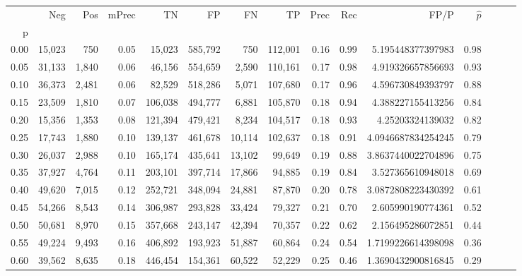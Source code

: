 \begin{tabular}{rrrrrrrrrrrrrrr}
\toprule
{} &     Neg &     Pos & mPrec &       TN &       FP &       FN &       TP &  Prec &   Rec &                 FP/P & $\hat{p}$ \\
p    &         &         &       &          &          &          &          &       &       &                      &           \\
\midrule
0.00 &  15,023 &     750 &  0.05 &   15,023 &  585,792 &      750 &  112,001 &  0.16 &  0.99 &    5.195448377397983 &      0.98 \\
0.05 &  31,133 &   1,840 &  0.06 &   46,156 &  554,659 &    2,590 &  110,161 &  0.17 &  0.98 &    4.919326657856693 &      0.93 \\
0.10 &  36,373 &   2,481 &  0.06 &   82,529 &  518,286 &    5,071 &  107,680 &  0.17 &  0.96 &    4.596730849393797 &      0.88 \\
0.15 &  23,509 &   1,810 &  0.07 &  106,038 &  494,777 &    6,881 &  105,870 &  0.18 &  0.94 &    4.388227155413256 &      0.84 \\
0.20 &  15,356 &   1,353 &  0.08 &  121,394 &  479,421 &    8,234 &  104,517 &  0.18 &  0.93 &     4.25203324139032 &      0.82 \\
0.25 &  17,743 &   1,880 &  0.10 &  139,137 &  461,678 &   10,114 &  102,637 &  0.18 &  0.91 &   4.0946687834254245 &      0.79 \\
0.30 &  26,037 &   2,988 &  0.10 &  165,174 &  435,641 &   13,102 &   99,649 &  0.19 &  0.88 &   3.8637440022704896 &      0.75 \\
0.35 &  37,927 &   4,764 &  0.11 &  203,101 &  397,714 &   17,866 &   94,885 &  0.19 &  0.84 &    3.527365610948018 &      0.69 \\
0.40 &  49,620 &   7,015 &  0.12 &  252,721 &  348,094 &   24,881 &   87,870 &  0.20 &  0.78 &   3.0872808223430392 &      0.61 \\
0.45 &  54,266 &   8,543 &  0.14 &  306,987 &  293,828 &   33,424 &   79,327 &  0.21 &  0.70 &    2.605990190774361 &      0.52 \\
0.50 &  50,681 &   8,970 &  0.15 &  357,668 &  243,147 &   42,394 &   70,357 &  0.22 &  0.62 &    2.156495286072851 &      0.44 \\
0.55 &  49,224 &   9,493 &  0.16 &  406,892 &  193,923 &   51,887 &   60,864 &  0.24 &  0.54 &   1.7199226614398098 &      0.36 \\
0.60 &  39,562 &   8,635 &  0.18 &  446,454 &  154,361 &   60,522 &   52,229 &  0.25 &  0.46 &   1.3690432900816845 &      0.29 \\

\end{tabular}
